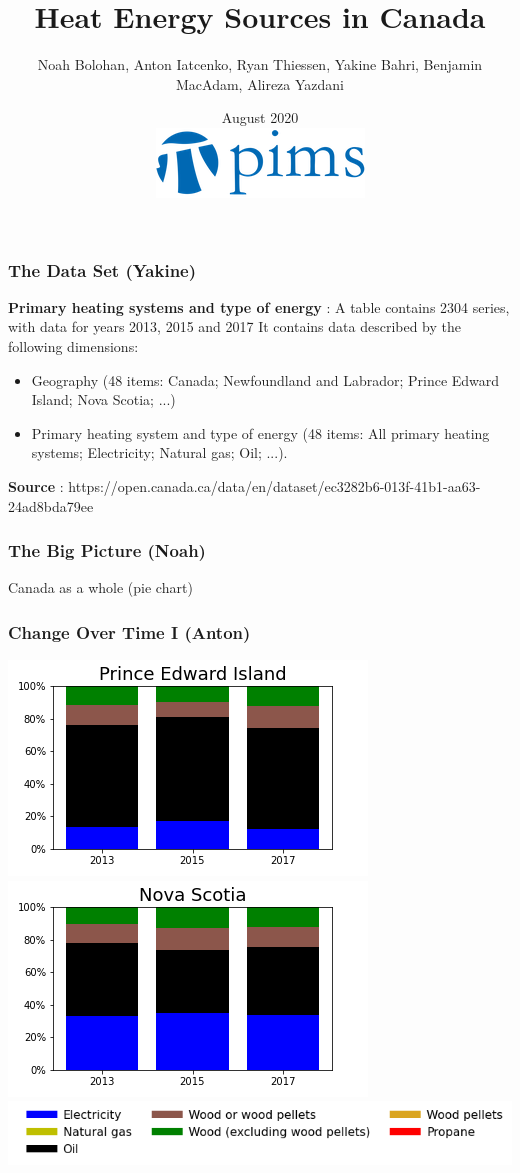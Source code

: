 \documentclass{beamer}
\title{Heat Energy Sources in Canada}
\author{Noah Bolohan, Anton Iatcenko, Ryan Thiessen, Yakine Bahri, Benjamin MacAdam, Alireza Yazdani}
\institute{Math\textsuperscript{Industry}}
\date{August 2020  \\ \vspace{30pt} \includegraphics[scale=0.3]{pims_logo.png} }
\begin{document}
\frame{\titlepage}

\begin{frame}
\frametitle{The Data Set (Yakine)}
\textbf{Primary heating systems and type of energy} : A table contains 2304 series, with data for years 2013, 2015 and 2017
It contains data described by the following dimensions:
\begin{itemize}
\item Geography (48 items: Canada; Newfoundland and Labrador; Prince Edward Island; Nova Scotia; ...)
\item Primary heating system and type of energy (48 items: All primary heating systems; Electricity; Natural gas; Oil; ...).
\end{itemize}
\textbf{Source} : https://open.canada.ca/data/en/dataset/ec3282b6-013f-41b1-aa63-24ad8bda79ee
\end{frame}


\begin{frame}
\frametitle{The Big Picture (Noah)}
Canada as a whole (pie chart)
\end{frame}



\begin{frame}
\frametitle{Change Over Time I (Anton)}
\includegraphics[width=0.5\linewidth]{pe.png}%
\includegraphics[width=0.5\linewidth]{ns.png}\\
\includegraphics[width=\linewidth]{leg_bar.png}
\end{frame}
\end{document}
